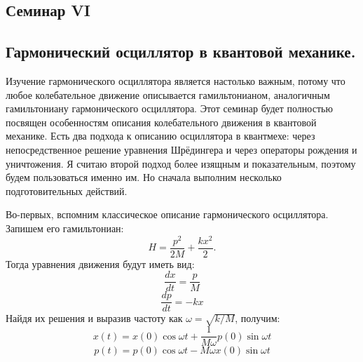 \begin{center}
    \section{Семинар VI}
\end{center}
\subsection{Гармонический осциллятор в квантовой механике.}
Изучение гармонического осциллятора является настолько важным, потому что любое колебательное движение описывается гамильтонианом, аналогичным гамильтониану гармонического осциллятора. Этот семинар будет полностью посвящен особенностям описания колебательного движения в квантовой механике. Есть два подхода к описанию осциллятора в квантмехе: через непосредственное решение уравнения Шрёдингера и через операторы рождения и уничтожения. Я считаю второй подход более изящным и показательным, поэтому будем пользоваться именно им. Но сначала выполним несколько подготовительных действий. 

Во-первых, вспомним классическое описание гармонического осциллятора. Запишем его гамильтониан:
\[
H = \frac{p^2}{2M} + \frac{kx^2}{2}.
\]
Тогда уравнения движения будут иметь вид:
\[
\frac{dx}{dt} = \frac{p}{M}
\]
\[
\frac{dp}{dt} = -kx
\]
Найдя их решения и выразив частоту как $\omega = \sqrt{k/M}$, получим:
\[
x(t) = x(0)\cos\omega t + \frac{1}{M\omega}p(0)\sin\omega t
\]
\[
p(t) = p(0)\cos \omega t - M\omega x(0) \sin\omega t
\]

